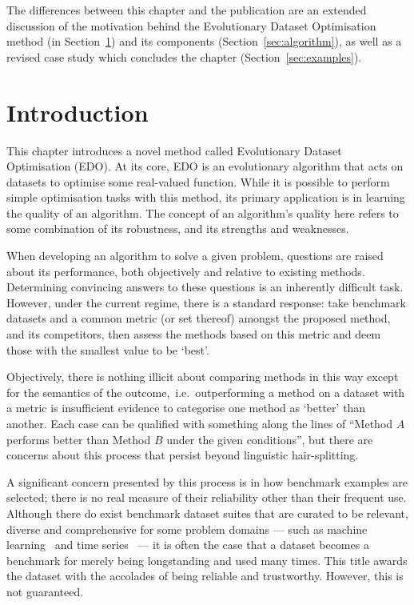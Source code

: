 \myrule%

The differences between this chapter and the publication are an extended
discussion of the motivation behind the Evolutionary Dataset Optimisation method
(in Section~\ref{sec:introduction}) and its components
(Section~\ref{sec:algorithm}), as well as a revised case study which concludes
the chapter (Section~\ref{sec:examples}).


\section{Introduction}\label{sec:introduction}

This chapter introduces a novel method called Evolutionary Dataset Optimisation
(EDO). At its core, EDO is an evolutionary algorithm that acts on datasets to
optimise some real-valued function. While it is possible to perform simple
optimisation tasks with this method, its primary application is in learning the
quality of an algorithm. The concept of an algorithm's quality here refers to
some combination of its robustness, and its strengths and weaknesses.

When developing an algorithm to solve a given problem, questions are raised
about its performance, both objectively and relative to existing methods.
Determining convincing answers to these questions is an inherently difficult
task. However, under the current regime, there is a standard response: take 
benchmark datasets and a common metric (or set thereof) amongst the proposed
method, and its competitors, then assess the methods based on this metric and
deem those with the smallest value to be `best'.

Objectively, there is nothing illicit about comparing methods in this way except
for the semantics of the outcome,~i.e.\ outperforming a method on a dataset with
a metric is insufficient evidence to categorise one method as `better' than
another. Each case can be qualified with something along the lines of ``Method
\(A\) performs better than Method \(B\) under the given conditions'', but there
are concerns about this process that persist beyond linguistic hair-splitting. 

A significant concern presented by this process is in how benchmark examples are
selected; there is no real measure of their reliability other than their
frequent use. Although there do exist benchmark dataset suites that are curated
to be relevant, diverse and comprehensive for some problem domains --- such as
machine learning~\cite{Dua2019,Olson2017} and time series~\cite{UCRArchive2018}
--- it is often the case that a dataset becomes a benchmark for merely being
longstanding and used many times. This title awards the dataset with the
accolades of being reliable and trustworthy. However, this is not guaranteed.

